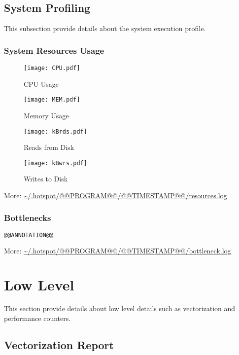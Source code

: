 \documentclass[a4paper]{article}
\begin{document}
\subsection{System Profiling}

This subsection provide details about the system execution profile.

\subsubsection{System Resources Usage}

\begin{figure}[H]
\label{fig:cpu}
\centering
\texttt{[image: CPU.pdf]}
\caption{CPU Usage}
\end{figure}

\begin{figure}[H]
\label{fig:memory}
\centering
\texttt{[image: MEM.pdf]}
\caption{Memory Usage}
\end{figure}

\begin{figure}[H]
\label{fig:reads}
\centering
\texttt{[image: kBrds.pdf]}
\caption{Reads from Disk}
\end{figure}

\begin{figure}[H]
\label{fig:writes}
\centering
\texttt{[image: kBwrs.pdf]}
\caption{Writes to Disk}
\end{figure}

More: \url{~/.hotspot/@@PROGRAM@@/@@TIMESTAMP@@/resources.log}

\subsubsection{Bottlenecks}

\begin{verbatim}
@@ANNOTATION@@
\end{verbatim}

More: \url{~/.hotspot/@@PROGRAM@@/@@TIMESTAMP@@/bottleneck.log}

\section{Low Level}

This section provide details about low level details such as vectorization and performance counters.

\subsection{Vectorization Report}
\end{document}
